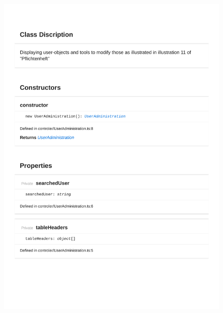 \begin{figure}[H]
\centerline{\includegraphics[width=\textwidth]{FrontendDocsAsPDF/Model/UserAdministration.pdf}}
\end{figure}

